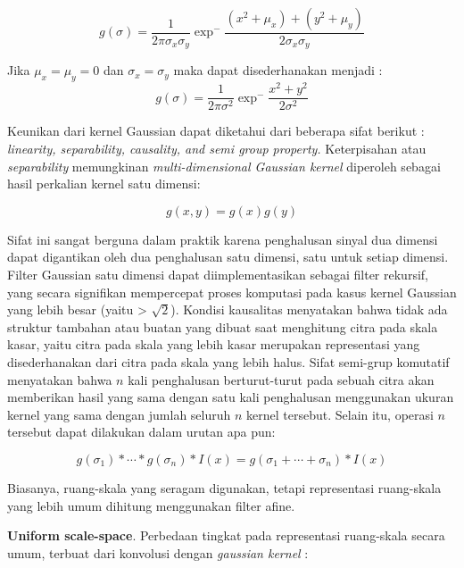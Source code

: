 \begin{equation*}
g(\sigma) = \frac{1}{2\pi\sigma_{x}\sigma_{y}}\exp^-\frac{(x^2+\mu_{x})+(y^2+\mu_{y})}{2\sigma_{x}\sigma_{y}}
\end{equation*}

Jika \(\mu_{x} = \mu_{y} = 0\) dan \(\sigma_{x} = \sigma_{y}\) maka dapat disederhanakan menjadi :
\begin{equation}
g(\sigma) = \frac{1}{2\pi\sigma^2}\exp^-\frac{x^2+y^2}{2\sigma^2}
\label{eq:gaussian kernel}
\end{equation}

Keunikan dari kernel Gaussian dapat diketahui dari beberapa sifat berikut : 
\emph{linearity, separability, causality, and semi group property.} Keterpisahan 
atau \emph{separability} memungkinan \emph{multi-dimensional Gaussian kernel} diperoleh sebagai hasil perkalian kernel satu dimensi:

\begin{equation*}
  g(x,y) = g(x)g(y)
\end{equation*}

Sifat ini sangat berguna dalam praktik karena penghalusan sinyal dua dimensi dapat digantikan oleh dua penghalusan satu dimensi, satu untuk setiap dimensi. 
Filter Gaussian satu dimensi dapat diimplementasikan sebagai filter rekursif, yang secara signifikan mempercepat proses 
komputasi pada kasus kernel Gaussian yang lebih besar (yaitu > \( \sqrt{2}\)). 
Kondisi kausalitas menyatakan bahwa tidak ada struktur tambahan atau buatan yang dibuat saat menghitung citra pada skala kasar, 
yaitu citra pada skala yang lebih kasar merupakan representasi yang disederhanakan dari citra pada skala yang lebih halus. 
Sifat semi-grup komutatif menyatakan bahwa \(n\) kali penghalusan berturut-turut pada sebuah citra akan memberikan hasil yang sama dengan satu kali penghalusan menggunakan ukuran kernel yang sama dengan jumlah seluruh \(n\) kernel tersebut. 
Selain itu, operasi \(n\) tersebut dapat dilakukan dalam urutan apa pun:

\begin{equation*}
g(\sigma_{1}) * \cdots * g(\sigma_{n}) * I(x) = g(\sigma_{1} + \cdots + \sigma_{n}) * I(x)
\end{equation*}

Biasanya, ruang-skala yang seragam digunakan, tetapi representasi ruang-skala yang lebih umum dihitung menggunakan filter afine.

\textbf{Uniform scale-space}. Perbedaan tingkat pada representasi ruang-skala secara umum, terbuat dari konvolusi dengan \emph{gaussian kernel} :

